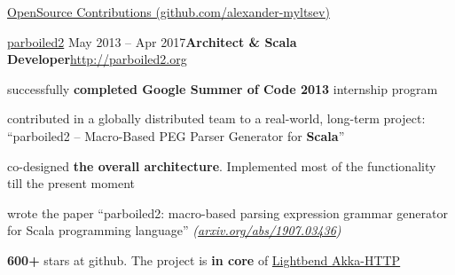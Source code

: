 \documentclass{resume} %
\begin{document}
\begin{rSection}{\href{https://github.com/alexander-myltsev?tab=repositories}{OpenSource
Contributions (github.com/alexander-myltsev)}}
\begin{samepage}
\begin{rSubsection}
{\href{http://parboiled2.org}{parboiled2}}
{May 2013 -- Apr 2017}{\textbf{Architect \& Scala Developer}}{\href{http://parboiled2.org}{http://parboiled2.org}}
\item successfully \textbf{completed Google Summer of Code 2013} internship program
\item contributed in a globally distributed team to a real-world, long-term project: ``parboiled2 -- Macro-Based PEG Parser Generator for \textbf{Scala}''
\item co-designed \textbf{the overall architecture}. Implemented most of the functionality till the present moment
\item wrote the paper ``parboiled2: macro-based parsing expression grammar generator for Scala programming language''
\textit{(\href{https://arxiv.org/abs/1907.03436}{arxiv.org/abs/1907.03436})}
\item \textbf{600+} stars at github. The project is \textbf{in core} of
\href{https://doc.akka.io/docs/akka-http/current/}{Lightbend Akka-HTTP}
\end{rSubsection}
\end{samepage}

\end{rSection}

\pagebreak

\end{document}

